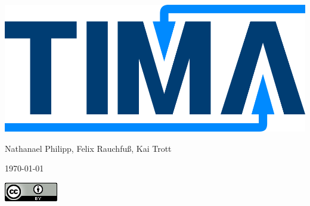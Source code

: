 \begin{titlepage}
  \begin{center}
    \vspace*{\fill}
    \includegraphics[scale=0.5]{images/tima.png}
    \vspace*{\fill}
  \end{center}
  \pagebreak
  \begin{center}
    \vspace*{\fill}

    \textbf{\Huge{}}

    \vspace{0.5cm}
    \textbf{\Large{}}

    \vspace{1cm}

    Nathanael Philipp, Felix Rauchfuß, Kai Trott

    \vspace{0.5cm}
    \today

    \vfill
    \includegraphics{images/cc-by.png}
  \end{center}
\end{titlepage}
